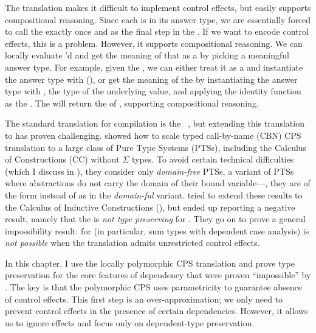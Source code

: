 The  translation makes it difficult to
implement control effects, but easily supports compositional reasoning.
Since each  is  in its answer type, we are
essentially forced to call the  exactly once and as the final
step in the .
If we want to encode control effects, this is a problem.
However, it supports compositional reasoning.
We can locally evaluate 'd  and get the meaning of
that  as a  by picking a meaningful answer type.
For example, given the 
, we can either treat it
as a  and instantiate the answer type with \im{\False}
(), or get the meaning of
the  by instantiating the answer type with , the
type of the underlying value, and applying the identity function as
the  .
The   will return the
 of , supporting compositional reasoning.

The standard translation for  compilation is
the ~\cite{morrisett1998:ftotal}, but
extending this translation to  has proven challenging.
\citet{barthe1999} showed how to scale typed call-by-name
(CBN) CPS translation to a large class of Pure Type Systems (PTSs), including
the Calculus of Constructions (CC) without \(\Sigma\) types.
To avoid certain technical difficulties (which I discuss
in ), they consider only \emph{domain-free} PTSs, a
variant of PTSs where \im{\lambda} abstractions do not carry the domain of their
bound variable---\ie, they are of the form  instead
of  as in the \emph{domain-ful} variant.
\citet{barthe2002} tried to extend these results to the Calculus of
Inductive Constructions (), but ended up reporting a negative
result, namely that the   
is \emph{not type preserving} for .
They go on to prove a general impossibility result: for  (in particular, sum types with dependent case analysis)
 is \emph{not possible} when the 
translation admits unrestricted control effects.

In this chapter, I use the locally polymorphic CPS translation and prove type
preservation for the core features of dependency that were proven ``impossible''
by \citeauthor{barthe2002}.
The key is that the polymorphic CPS uses parametricity to guarantee absence of
control effects.
This first step is an over-approximation; we only need to prevent control
effects in the presence of certain dependencies.
However, it allows us to ignore effects and focus only on dependent-type
preservation.
